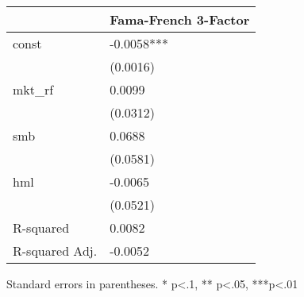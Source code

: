 \begin{table}
\caption{}
\label{}
\begin{center}
\begin{tabular}{ll}
\hline
               & Fama-French 3-Factor  \\
\hline
const          & -0.0058***            \\
               & (0.0016)              \\
mkt\_rf        & 0.0099                \\
               & (0.0312)              \\
smb            & 0.0688                \\
               & (0.0581)              \\
hml            & -0.0065               \\
               & (0.0521)              \\
R-squared      & 0.0082                \\
R-squared Adj. & -0.0052               \\
\hline
\end{tabular}
\end{center}
\end{table}
\bigskip
Standard errors in parentheses. \newline 
* p<.1, ** p<.05, ***p<.01